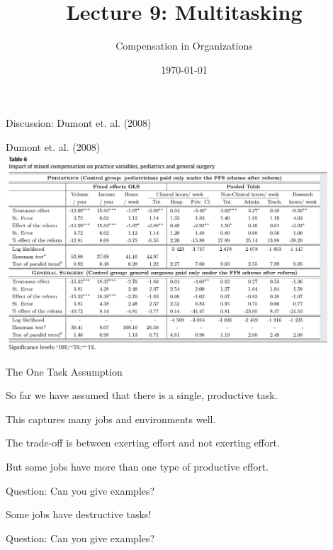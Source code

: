 \documentclass[aspectratio=169,usenames,dvipsnames]{beamer}
\title[diss]{Lecture 9: Multitasking} %
\author{Compensation in Organizations} %
\institute[shortinst]{Jacob Kohlhepp}
\date{\today} %
\newenvironment{wideitemize}{\itemize\addtolength{\itemsep}{10pt}}{\enditemize}
\begin{document}
\begin{frame}
\titlepage %

\end{frame}

\begin{frame}
\centering
    \huge Discussion: Dumont et. al. (2008)
\end{frame}

\begin{frame}[c]{Dumont et. al. (2008)}
\centering
\includegraphics[width=0.9\textwidth]{pictures/multitask_doctors.png}
\end{frame}

\begin{frame}{The One Task Assumption}
    \begin{wideitemize}
        \item So far we have assumed that there is a single, productive task.
        \item This captures many jobs and environments well.
        \item The trade-off is between exerting effort and not exerting effort.
        \item But some jobs have more than one type of productive effort.
        \begin{wideitemize}
            \item Question: Can you give examples?
        \end{wideitemize}
        \item Some jobs have destructive tasks!
        \begin{wideitemize}
            \item Question: Can you give examples?
        \end{wideitemize}
    \end{wideitemize}
\end{frame}
\end{document}
